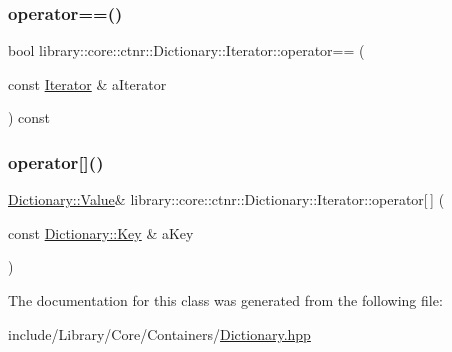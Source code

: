 \subsubsection{\texorpdfstring{operator==()}{operator==()}}
{\footnotesize\ttfamily bool library\+::core\+::ctnr\+::\+Dictionary\+::\+Iterator\+::operator== (\begin{DoxyParamCaption}\item[{const \hyperlink{classlibrary_1_1core_1_1ctnr_1_1_dictionary_1_1_iterator}{Iterator} \&}]{a\+Iterator }\end{DoxyParamCaption}) const}

\mbox{\label{classlibrary_1_1core_1_1ctnr_1_1_dictionary_1_1_iterator_a89151ad07a4b475b62673fd933535714}} 
\subsubsection{\texorpdfstring{operator[]()}{operator[]()}}
{\footnotesize\ttfamily \hyperlink{classlibrary_1_1core_1_1ctnr_1_1_dictionary_a3baf6692694e4fc27cb399ac083c88ea}{Dictionary\+::\+Value}\& library\+::core\+::ctnr\+::\+Dictionary\+::\+Iterator\+::operator\mbox{[}$\,$\mbox{]} (\begin{DoxyParamCaption}\item[{const \hyperlink{classlibrary_1_1core_1_1ctnr_1_1_dictionary_a987cae687cce70d81a2a483c5e05e842}{Dictionary\+::\+Key} \&}]{a\+Key }\end{DoxyParamCaption})}



The documentation for this class was generated from the following file\+:\begin{DoxyCompactItemize}
\item 
include/\+Library/\+Core/\+Containers/\hyperlink{_dictionary_8hpp}{Dictionary.\+hpp}\end{DoxyCompactItemize}
